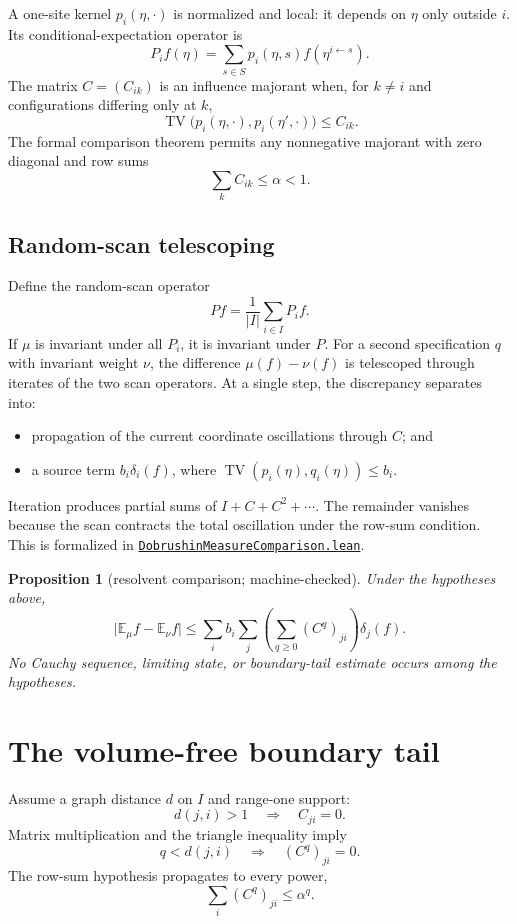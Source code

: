 \documentclass[11pt]{article}
\newtheorem{proposition}[theorem]{Proposition}
\theoremstyle{definition}
\newcommand{\E}{\mathbb E}
\newcommand{\TV}{\operatorname{TV}}
\newcommand{\abs}[1]{\lvert #1\rvert}
\newcommand{\sourceanchor}{f587b35001f4ae87c7fe0383662864df6bc9a1c0}
\newcommand{\leanfile}[2]{%
  \href{https://github.com/lluiseriksson/THE-ERIKSSON-PROGRAMME/blob/\sourceanchor/YangMills/OS/#1.lean}{\nolinkurl{#2.lean}}}
\begin{document}
A one-site kernel $p_i(\eta,\cdot)$ is normalized and local: it depends on
$\eta$ only outside $i$.  Its conditional-expectation operator is
\[
  P_i f(\eta)=\sum_{s\in S}p_i(\eta,s)
     f(\eta^{i\leftarrow s}).
\]
The matrix $C=(C_{ik})$ is an influence majorant when, for $k\ne i$ and
configurations differing only at $k$,
\[
  \TV\bigl(p_i(\eta,\cdot),p_i(\eta',\cdot)\bigr)\le C_{ik}.
\]
The formal comparison theorem permits any nonnegative majorant with zero
diagonal and row sums
\[
  \sum_k C_{ik}\le\alpha<1.
\]

\subsection{Random-scan telescoping}

Define the random-scan operator
\[
  Pf=\frac1{\abs I}\sum_{i\in I}P_i f.
\]
If $\mu$ is invariant under all $P_i$, it is invariant under $P$.  For a
second specification $q$ with invariant weight $\nu$, the difference
$\mu(f)-\nu(f)$ is telescoped through iterates of the two scan operators.
At a single step, the discrepancy separates into:
\begin{itemize}
\item propagation of the current coordinate oscillations through $C$; and
\item a source term $b_i\delta_i(f)$, where
  $\TV(p_i(\eta),q_i(\eta))\le b_i$.
\end{itemize}
Iteration produces partial sums of $I+C+C^2+\cdots$.  The remainder vanishes
because the scan contracts the total oscillation under the row-sum condition.
This is formalized in
\leanfile{DobrushinMeasureComparison}{DobrushinMeasureComparison}.

\begin{proposition}[resolvent comparison; machine-checked]
Under the hypotheses above,
\[
  \abs{\E_\mu f-\E_\nu f}
  \le
  \sum_i b_i\sum_j\left(\sum_{q\ge0}(C^q)_{ji}\right)\delta_j(f).
\]
No Cauchy sequence, limiting state, or boundary-tail estimate occurs among the
hypotheses.
\end{proposition}

\section{The volume-free boundary tail}

Assume a graph distance $d$ on $I$ and range-one support:
\[
  d(j,i)>1\quad\Longrightarrow\quad C_{ji}=0.
\]
Matrix multiplication and the triangle inequality imply
\[
  q<d(j,i)\quad\Longrightarrow\quad (C^q)_{ji}=0.
\]
The row-sum hypothesis propagates to every power,
\[
  \sum_i(C^q)_{ji}\le\alpha^q.
\]
\end{document}
